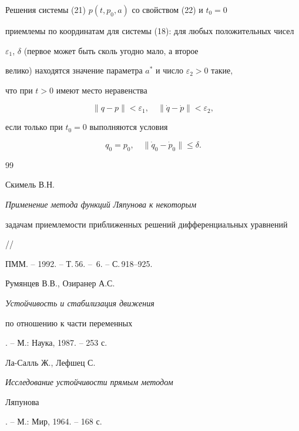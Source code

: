  


Решения системы (21) $p(t,p_0,a)$ со свойством (22) и $t_0=0$


приемлемы по координатам для системы (18): для любых положительных чисел  


$\varepsilon_1$, $\delta$ (первое может быть сколь угодно мало, а второе 


велико) находятся значение параметра $a^*$ и число $\varepsilon_2>0$ такие, 


что при $t>0$ имеют место неравенства 


$$ 


\|q-p\|<\varepsilon_1,\quad\|\Dot q-\Dot p\|<\varepsilon_2, 


$$  


если только при $t_0=0$ выполняются условия 


$$ 


q_0=p_0,\quad \|\Dot q_0-\Dot p_0\|\le\delta. 


$$ 


 


\begin{thebibliography}{99} 


 




Скимель В.Н. {\em Применение метода функций Ляпунова к некоторым  


задачам приемлемости приближенных решений дифференциальных уравнений} //  


ПММ. -- 1992. -- Т.\,56. -- \No\,6. -- С.\,918--925. 




Румянцев В.В., Озиранер А.С. {\em Устойчивость и стабилизация движения 


по отношению к части переменных}. -- М.: Наука, 1987. -- 253 с. 




Ла-Салль Ж., Лефшец С. {\em Исследование устойчивости прямым методом  


Ляпунова}. -- М.: Мир, 1964. -- 168 с. 


 


\end{thebibliography} 


 


\vskip 2cm 


 






 


\label{end} 


 


 


 


